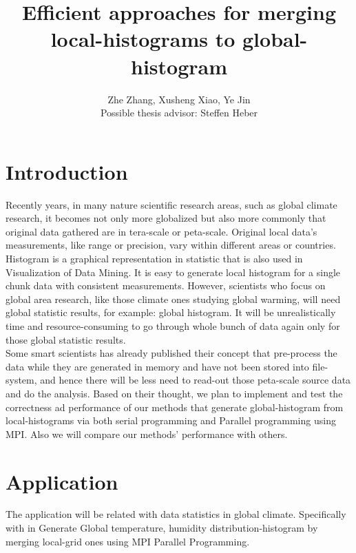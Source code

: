 \documentclass[11pt]{article}
\title{ Efficient approaches for merging local-histograms to global-histogram}
\author{Zhe Zhang, Xusheng Xiao, Ye Jin \\ Possible thesis advisor:  Steffen Heber}
\begin{document}
\lstset{language=C++,basicstyle=\small,
        stringstyle=\ttfamily,showstringspaces=false}

\singlespace
\maketitle


\doublespace
\setcounter{secnumdepth}{2}

\section{Introduction}
Recently years, in many nature scientific research areas, such as global climate research, it becomes not only more globalized but also more commonly that original data gathered are in tera-scale or peta-scale. Original local data's measurements, like range or precision, vary within different areas or countries. \\
Histogram is a graphical representation in statistic that is also used in Visualization of Data Mining. It is easy to generate local histogram for a single chunk data with consistent measurements. However, scientists who focus on global area research, like those climate ones studying global warming, will need global statistic results, for example: global histogram. It will be unrealistically time and resource-consuming to go through whole bunch of data again only for those global statistic results.\\
Some smart scientists has already published their concept that pre-process the data while they are generated in memory and have not been stored into file-system, and hence there will be less need to read-out those peta-scale source data and do the analysis.\cite{PredatA} Based on their thought, we plan to implement and test the correctness ad performance of our methods that generate global-histogram from local-histograms via both serial programming and Parallel programming using MPI. Also we will compare our methods' performance with others\cite{21}. 

\section{Application}
The application will be related with data statistics in global climate. Specifically with in Generate Global temperature, humidity distribution-histogram by merging local-grid ones using MPI Parallel Programming.
\end{document}

